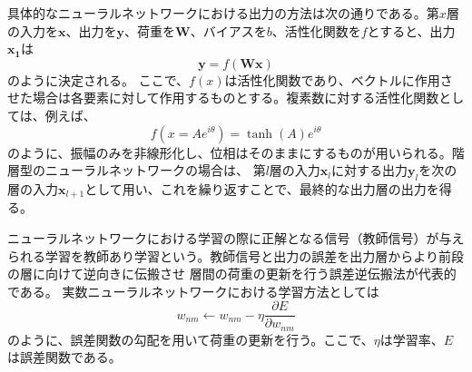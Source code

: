 \documentclass[11pt,a4paper,uplatex]{ujarticle}
\begin{document}
    具体的なニューラルネットワークにおける出力の方法は次の通りである。第$x$層の入力を$\bm{x}$、出力を$\bm{y}$、荷重を$\bm{W}$、バイアスを$b$、活性化関数を$f$とすると、出力$\bm{x_1}$は
    \begin{equation}
      \bm{y} = f(\bm{W}\bm{x})
    \end{equation}
    のように決定される。
    ここで、$f(x)$は活性化関数であり、ベクトルに作用させた場合は各要素に対して作用するものとする。複素数に対する活性化関数としては、例えば、
    \begin{equation}\label{activation_function}
      f(x = Ae^{i\theta}) = \tanh(A)e^{i\theta}
    \end{equation}
    のように、振幅のみを非線形化し、位相はそのままにするものが用いられる。階層型のニューラルネットワークの場合は、
    第$l$層の入力$\bm{x}_l$に対する出力$\bm{y}_l$を次の層の入力$\bm{x}_{l+1}$として用い、これを繰り返すことで、最終的な出力層の出力を得る。

    ニューラルネットワークにおける学習の際に正解となる信号（教師信号）が与えられる学習を教師あり学習という。教師信号と出力の誤差を出力層からより前段の層に向けて逆向きに伝搬させ
    層間の荷重の更新を行う誤差逆伝搬法が代表的である。
    実数ニューラルネットワークにおける学習方法としては
    \begin{equation}
      w_{nm} \leftarrow w_{nm} - \eta \frac{\partial E}{\partial w_{nm}}
    \end{equation}
    のように、誤差関数の勾配を用いて荷重の更新を行う。ここで、$\eta$は学習率、$E$は誤差関数である。
\end{document}
